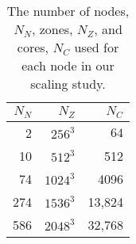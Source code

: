 
\begin{table}[h]
\begin{center}
\caption{The number of nodes, $N_N$, zones, $N_Z$, and cores, $N_C$ used for each
node in our scaling study.}
\label{table1}                                                                                                                                                               
\begin{tabular}{rrr}
$N_N$ & $N_Z$ & $N_C$\\
\hline
2 & $256^3$ & $64$\\
10 & $512^3$ & 512 \\
74 & $1024^3$ & 4096 \\
274 & $1536^3$ & 13,824\\
586 & $2048^3$ & 32,768\\
\hline
\end{tabular}                                                                                                                                                               
\end{center}
\end{table}                                                                                                                                                                
